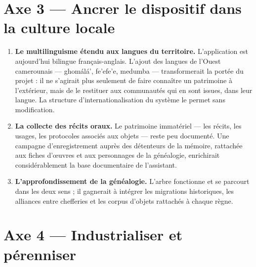 \section*{Axe 3 — Ancrer le dispositif dans la culture locale}

\begin{enumerate}
  \item \textbf{Le multilinguisme étendu aux langues du territoire.}
        L'application est aujourd'hui bilingue français-anglais. L'ajout des
        langues de l'Ouest camerounais — ghomálá', fe'efe'e, medumba —
        transformerait la portée du projet : il ne s'agirait plus seulement de
        faire connaître un patrimoine à l'extérieur, mais de le restituer aux
        communautés qui en sont issues, dans leur langue. La structure
        d'internationalisation du système le permet sans modification.

  \item \textbf{La collecte des récits oraux.} Le patrimoine immatériel — les
        récits, les usages, les protocoles associés aux objets — reste peu
        documenté. Une campagne d'enregistrement auprès des détenteurs de la
        mémoire, rattachée aux fiches d'œuvres et aux personnages de la
        généalogie, enrichirait considérablement la base documentaire de
        l'assistant.

  \item \textbf{L'approfondissement de la généalogie.} L'arbre fonctionne et se
        parcourt dans les deux sens ; il gagnerait à intégrer les migrations
        historiques, les alliances entre chefferies et les corpus d'objets
        rattachés à chaque règne.
\end{enumerate}

\section*{Axe 4 — Industrialiser et pérenniser}

